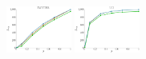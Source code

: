 \documentclass[a4paper]{report}
\newcommand{\wratio}{0.16}
\begin{document}
\vfill
\includegraphics[width=\wratio\textwidth]{influence/TWITTER/fs_twitter}\hfill
\includegraphics[width=\wratio\textwidth]{influence/UCI/fs_uci}\hfill
\clearpage
\end{document}
